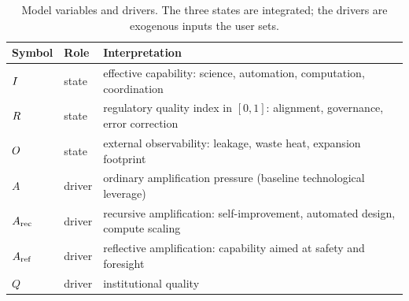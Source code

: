 \begin{table}[tb]
\centering\small
\caption{Model variables and drivers. The three states are integrated; the
drivers are exogenous inputs the user sets.}
\label{tab:vars}
\begin{tabular}{@{}llp{7.1cm}@{}}
\toprule
Symbol & Role & Interpretation \\
\midrule
$I$   & state  & effective capability: science, automation, computation, coordination \\
$R$    & state  & regulatory quality index in $[0,1]$: alignment, governance, error correction \\
$O$    & state  & external observability: leakage, waste heat, expansion footprint \\
\midrule
$A$       & driver & ordinary amplification pressure (baseline technological leverage) \\
$A_{\mathrm{rec}}$   & driver & recursive amplification: self-improvement, automated design, compute scaling \\
$A_{\mathrm{ref}}$   & driver & reflective amplification: capability aimed at safety and foresight \\
$Q$       & driver & institutional quality \\
\bottomrule
\end{tabular}
\end{table}

